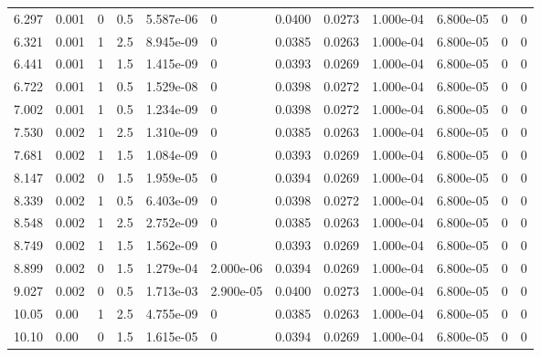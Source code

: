 \documentclass[preview]{standalone}
\begin{document}
{{\begin{tabular}{L{1.2cm}C{1.2cm} C{0.3cm}C{0.5cm} C{1.4cm}C{1.4cm} C{1.4cm}C{1.4cm} C{1.6cm}C{1.6cm} C{1.6cm}C{1.6cm}}
  6.297  &  0.001  & 0     & 0.5 &  5.587e-06  & 0  &  0.0400&   0.0273& 1.000e-04 & 6.800e-05   &  0 & 0  \\ 
  6.321  &  0.001  & 1     & 2.5 &  8.945e-09  & 0  &  0.0385&   0.0263& 1.000e-04 & 6.800e-05   &  0 & 0  \\ 
  6.441  &  0.001  & 1     & 1.5 &  1.415e-09  & 0  &  0.0393&   0.0269& 1.000e-04 & 6.800e-05   &  0 & 0  \\ 
  6.722  &  0.001  & 1     & 0.5 &  1.529e-08  & 0  &  0.0398&   0.0272& 1.000e-04 & 6.800e-05   &  0 & 0  \\ 
  7.002  &  0.001  & 1     & 0.5 &  1.234e-09  & 0  &  0.0398&   0.0272& 1.000e-04 & 6.800e-05   &  0 & 0  \\ 
  7.530  &  0.002  & 1     & 2.5 &  1.310e-09  & 0  &  0.0385&   0.0263& 1.000e-04 & 6.800e-05   &  0 & 0  \\ 
  7.681  &  0.002  & 1     & 1.5 &  1.084e-09  & 0  &  0.0393&   0.0269& 1.000e-04 & 6.800e-05   &  0 & 0  \\ 
  8.147  &  0.002  & 0     & 1.5 &  1.959e-05  & 0  &  0.0394&   0.0269& 1.000e-04 & 6.800e-05   &  0 & 0  \\ 
  8.339  &  0.002  & 1     & 0.5 &  6.403e-09  & 0  &  0.0398&   0.0272& 1.000e-04 & 6.800e-05   &  0 & 0  \\ 
  8.548  &  0.002  & 1     & 2.5 &  2.752e-09  & 0  &  0.0385&   0.0263& 1.000e-04 & 6.800e-05   &  0 & 0  \\ 
  8.749  &  0.002  & 1     & 1.5 &  1.562e-09  & 0  &  0.0393&   0.0269& 1.000e-04 & 6.800e-05   &  0 & 0  \\ 
  8.899  &  0.002  & 0     & 1.5 &  1.279e-04  & 2.000e-06  &  0.0394&   0.0269& 1.000e-04 & 6.800e-05   &  0 & 0  \\ 
  9.027  &  0.002  & 0     & 0.5 &  1.713e-03  & 2.900e-05  &  0.0400&   0.0273& 1.000e-04 & 6.800e-05   &  0 & 0  \\ 
  10.05  &  0.00  & 1     & 2.5 &  4.755e-09  & 0  &  0.0385&   0.0263& 1.000e-04 & 6.800e-05   &  0 & 0  \\ 
  10.10  &  0.00  & 0     & 1.5 &  1.615e-05  & 0  &  0.0394&   0.0269& 1.000e-04 & 6.800e-05   &  0 & 0  \\ 
\hline 
\end{tabular} 

}}
\end{document}
